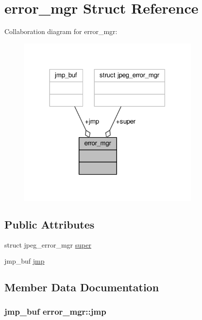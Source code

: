 \hypertarget{structerror__mgr}{}\section{error\+\_\+mgr Struct Reference}
\label{structerror__mgr}


Collaboration diagram for error\+\_\+mgr\+:
\nopagebreak
\begin{figure}[H]
\begin{center}
\leavevmode
\includegraphics[width=258pt]{structerror__mgr__coll__graph}
\end{center}
\end{figure}
\subsection*{Public Attributes}
\begin{DoxyCompactItemize}
\item 
struct jpeg\+\_\+error\+\_\+mgr \hyperlink{structerror__mgr_a05d0382955eda152db1b6fa9ff3a3d6e}{super}
\item 
jmp\+\_\+buf \hyperlink{structerror__mgr_a1e0f88f95302e5df0a0a5ca8dac7ce9c}{jmp}
\end{DoxyCompactItemize}


\subsection{Member Data Documentation}
\subsubsection[{\texorpdfstring{jmp}{jmp}}]{\setlength{\rightskip}{0pt plus 5cm}jmp\+\_\+buf error\+\_\+mgr\+::jmp}\hypertarget{structerror__mgr_a1e0f88f95302e5df0a0a5ca8dac7ce9c}{}\label{structerror__mgr_a1e0f88f95302e5df0a0a5ca8dac7ce9c}
